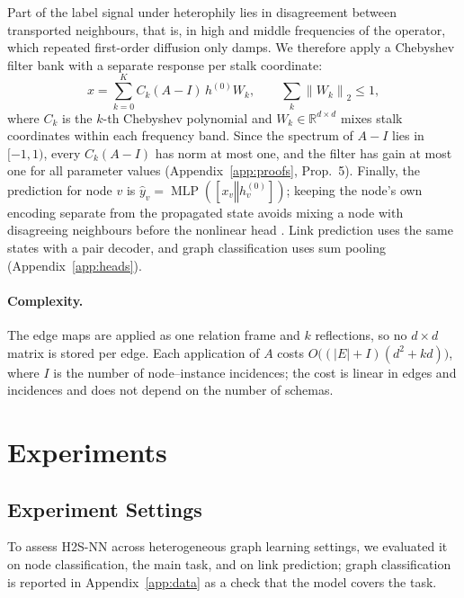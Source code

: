 \documentclass{article}
\newcommand{\R}{\mathbb{R}}
\newcommand{\method}{\textsc{H2S-NN}}
\newcommand{\norm}[1]{\left\lVert #1\right\rVert}
\newcommand{\concat}{\mathbin\Vert}
\begin{document}
Part of the label signal under heterophily lies in disagreement between transported neighbours, that is, in high and middle frequencies of the operator, which repeated first-order diffusion only damps. We therefore apply a Chebyshev filter bank \cite{defferrard2016chebnet,he2022chebnetii} with a separate response per stalk coordinate:
\begin{equation}
  x=\sum_{k=0}^{K}C_k(A-I)\,h^{(0)}W_k,\qquad \sum_k\norm{W_k}_2\le 1,
  \label{eq:filter}
\end{equation}
where $C_k$ is the $k$-th Chebyshev polynomial and $W_k\in\R^{d\times d}$ mixes stalk coordinates within each frequency band. Since the spectrum of $A-I$ lies in $[-1,1)$, every $C_k(A-I)$ has norm at most one, and the filter has gain at most one for all parameter values (Appendix~\ref{app:proofs}, Prop.~5). Finally, the prediction for node $v$ is $\hat{y}_v=\operatorname{MLP}([x_v\concat h_v^{(0)}])$; keeping the node's own encoding separate from the propagated state avoids mixing a node with disagreeing neighbours before the nonlinear head \cite{zhu2020beyond}. Link prediction uses the same states with a pair decoder, and graph classification uses sum pooling (Appendix~\ref{app:heads}).

\paragraph{Complexity.} The edge maps are applied as one relation frame and $k$ reflections, so no $d\times d$ matrix is stored per edge. Each application of $A$ costs $O\bigl((|E|+I)(d^2+kd)\bigr)$, where $I$ is the number of node--instance incidences; the cost is linear in edges and incidences and does not depend on the number of schemas.

\section{Experiments}
\label{sec:experiments}

\subsection{Experiment Settings}
To assess \method{} across heterogeneous graph learning settings, we evaluated it on node classification, the main task, and on link prediction; graph classification is reported in Appendix~\ref{app:data} as a check that the model covers the task.
\end{document}

